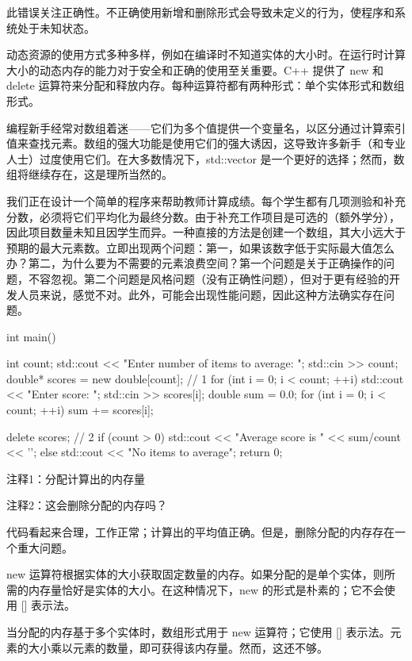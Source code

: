 此错误关注正确性。不正确使用新增和删除形式会导致未定义的行为，使程序和系统处于未知状态。

动态资源的使用方式多种多样，例如在编译时不知道实体的大小时。在运行时计算大小的动态内存的能力对于安全和正确的使用至关重要。C++ 提供了 new 和 delete 运算符来分配和释放内存。每种运算符都有两种形式：单个实体形式和数组形式。


编程新手经常对数组着迷——它们为多个值提供一个变量名，以区分通过计算索引值来查找元素。数组的强大功能是使用它们的强大诱因，这导致许多新手（和专业人士）过度使用它们。在大多数情况下，std::vector 是一个更好的选择；然而，数组将继续存在，这是理所当然的。

我们正在设计一个简单的程序来帮助教师计算成绩。每个学生都有几项测验和补充分数，必须将它们平均化为最终分数。由于补充工作项目是可选的（额外学分），因此项目数量未知且因学生而异。一种直接的方法是创建一个数组，其大小远大于预期的最大元素数。立即出现两个问题：第一，如果该数字低于实际最大值怎么办？第二，为什么要为不需要的元素浪费空间？第一个问题是关于正确操作的问题，不容忽视。第二个问题是风格问题（没有正确性问题），但对于更有经验的开发人员来说，感觉不对。此外，可能会出现性能问题，因此这种方法确实存在问题。


\begin{cpp}
int main() {
  int count;
  std::cout << "Enter number of items to average: ";
  std::cin >> count;
  double* scores = new double[count]; // 1
  for (int i = 0; i < count; ++i) {
    std::cout << "Enter score: ";
    std::cin >> scores[i];
  }
  double sum = 0.0;
  for (int i = 0; i < count; ++i)
    sum += scores[i];

  delete scores; // 2
  if (count > 0)
    std::cout << "Average score is " << sum/count << '\n';
  else
    std::cout << "No items to average\n";
  return 0;
}
\end{cpp}

{\footnotesize
注释1：分配计算出的内存量

注释2：这会删除分配的内存吗？
}


代码看起来合理，工作正常；计算出的平均值正确。但是，删除分配的内存存在一个重大问题。

new 运算符根据实体的大小获取固定数量的内存。如果分配的是单个实体，则所需的内存量恰好是实体的大小。在这种情况下，new 的形式是朴素的；它不会使用 [] 表示法。

当分配的内存基于多个实体时，数组形式用于 new 运算符；它使用 [] 表示法。元素的大小乘以元素的数量，即可获得该内存量。然而，这还不够。

